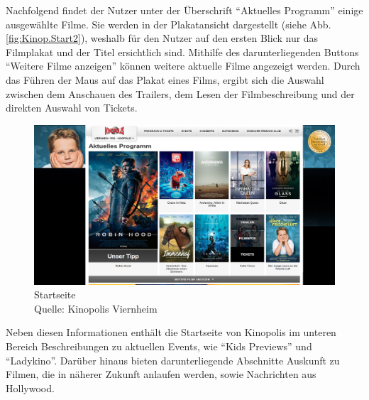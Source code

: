 	Nachfolgend findet der Nutzer unter der Überschrift \enquote{Aktuelles Programm} einige ausgewählte Filme. Sie werden in der Plakatansicht dargestellt (siehe Abb. \vref{fig:Kinop.Start2}), weshalb für den Nutzer auf den ersten Blick nur das Filmplakat und der Titel ersichtlich sind. Mithilfe des darunterliegenden Buttons \enquote{Weitere Filme anzeigen} können weitere aktuelle Filme angezeigt werden. Durch das Führen der Maus auf das Plakat eines Films, ergibt sich die Auswahl zwischen dem Anschauen des Trailers, dem Lesen der Filmbeschreibung und der direkten Auswahl von Tickets.
	\begin{figure}
		\centering 
		\includegraphics[width=14cm]{img/Kinopolis_MA_Start2.png}
		\captionsetup{format=hang}
		\centering\caption[Startseite 2]{\label{fig:Kinop.Start2}Startseite \\Quelle: Kinopolis Viernheim}
	\end{figure}
	
	Neben diesen Informationen enthält die Startseite von Kinopolis im unteren Bereich Beschreibungen zu aktuellen Events, wie \enquote{Kids Previews} und \enquote{Ladykino}. Darüber hinaus bieten darunterliegende Abschnitte Auskunft zu Filmen, die in näherer Zukunft anlaufen werden, sowie Nachrichten aus Hollywood. 
	
